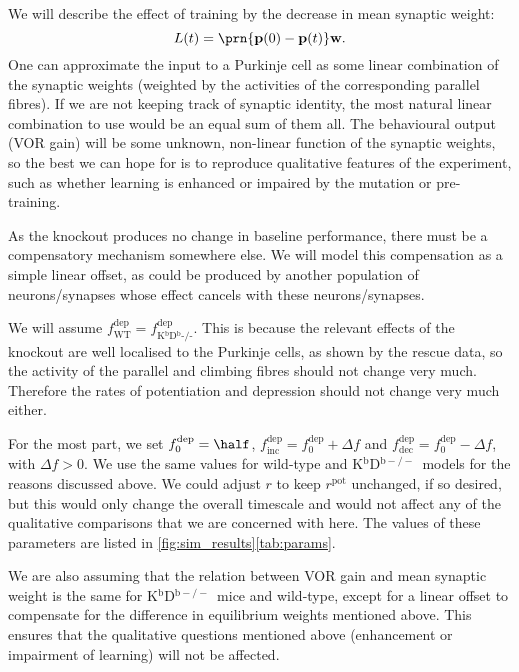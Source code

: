 \documentclass[10pt]{article}
\newcommand{\pr}{\mathbf{p}}
\newcommand{\w}{\mathbf{w}}
\newcommand{\pot}{^{\text{pot}}}
\newcommand{\dep}{^{\text{dep}}}
\newcommand{\norm}{_0}
\newcommand{\inc}{_{\text{inc}}}
\newcommand{\dec}{_{\text{dec}}}
\newcommand{\wt}{_{\text{WT}}}
\newcommand{\ko}{_{\text{K$^\mathrm{b}$D$^\mathrm{b}$-/-}}}
\newcommand{\KO}{K$^\mathrm{b}$D$^{\mathrm{b}-/-}$}
\begin{document}
We will describe the effect of training by the decrease in mean synaptic weight:
%
\begin{equation}\label{eq:learning}
  L(t) = \prn{\pr(0)-\pr(t)}\w.
\end{equation}
%
One can approximate the input to a Purkinje cell as some linear combination of the synaptic weights (weighted by the activities of the corresponding parallel fibres).
If we are not keeping track of synaptic identity, the most natural linear combination to use would be an equal sum of them all.
The behavioural output (VOR gain) will be some unknown, non-linear function of the synaptic weights, so the best we can hope for is to reproduce qualitative features of the experiment, such as whether learning is enhanced or impaired by the mutation or pre-training.

As the knockout produces no change in baseline performance, there must be a compensatory mechanism somewhere else.
We will model this compensation as a simple linear offset, as could be produced by another population of neurons/synapses whose effect cancels with these neurons/synapses.

We will assume $f\dep\wt=f\dep\ko$.
This is because the relevant effects of the knockout are well localised to the Purkinje cells, as shown by the rescue data, so the activity of the parallel and climbing fibres should not change very much.
Therefore the rates of potentiation and depression should not change very much either.

For the most part, we set $f\dep\norm=\half$, $f\dep\inc=f\dep\norm+\Delta f$ and $f\dep\dec=f\dep\norm-\Delta f$, with $\Delta f>0$.
We use the same values for wild-type and \KO\ models for the reasons discussed above.
We could adjust $r$ to keep $r\pot$ unchanged, if so desired, but this would only change the overall timescale and would not affect any of the qualitative comparisons that we are concerned with here.
The values of these parameters are listed in \autoref{fig:sim_results}\ref{tab:params}.

We are also assuming that the relation between VOR gain and mean synaptic weight is the same for \KO\ mice and wild-type, except for a linear offset to compensate for the difference in equilibrium weights mentioned above.
This ensures that the qualitative questions mentioned above (enhancement or impairment of learning) will not be affected.
\end{document}
